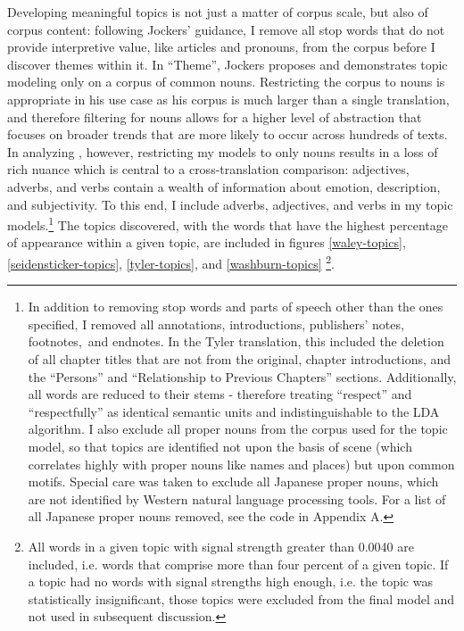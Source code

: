 \documentclass[12pt]{article}
\begin{document}
\begin{flushleft}
\begin{spacing}{2.0}
Developing meaningful topics is not just a matter of corpus scale, but also of corpus content: following Jockers' guidance, I remove all stop words that do not provide interpretive value, like articles and pronouns, from the corpus before I discover themes within it. In ``Theme'', Jockers proposes and demonstrates topic modeling only on a corpus of common nouns. Restricting the corpus to nouns is appropriate in his use case as his corpus is much larger than a single  translation, and therefore filtering for nouns allows for a higher level of abstraction that focuses on broader trends that are more likely to occur across hundreds of texts. In analyzing , however, restricting my models to only nouns results in a loss of rich nuance which is central to a cross-translation comparison: adjectives, adverbs, and verbs contain a wealth of information about emotion, description, and subjectivity. To this end, I include adverbs, adjectives, and verbs in my topic models.\footnote{ In addition to removing stop words and parts of speech other than the ones specified, I removed all annotations, introductions, publishers' notes, footnotes, and endnotes. In the Tyler translation, this included the deletion of all chapter titles that are not from the original, chapter introductions, and the ``Persons'' and ``Relationship to Previous Chapters'' sections. Additionally, all words are reduced to their stems - therefore treating ``respect'' and ``respectfully'' as identical semantic units and indistinguishable to the LDA algorithm. I also exclude all proper nouns from the corpus used for the topic model, so that topics are identified not upon the basis of scene (which correlates highly with proper nouns like names and places) but upon common motifs. Special care was taken to exclude all Japanese proper nouns, which are not identified by Western natural language processing tools. For a list of all Japanese proper nouns removed, see the code in Appendix A.} The topics discovered, with the words that have the highest percentage of appearance within a given topic, are included in figures \ref{waley-topics}, \ref{seidensticker-topics}, \ref{tyler-topics}, and \ref{washburn-topics} \footnote{All words in a given topic with signal strength greater than 0.0040 are included, i.e. words that comprise more than four percent of a given topic. If a topic had no words with signal strengths high enough, i.e. the topic was statistically insignificant, those topics were excluded from the final model and not used in subsequent discussion.}.


\end{spacing}
\end{flushleft}
\end{document}
